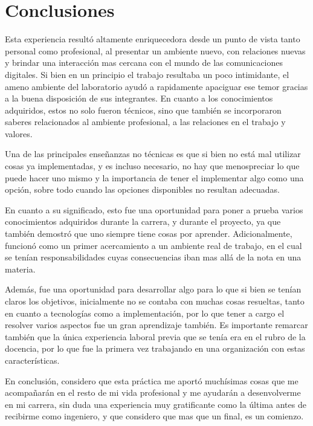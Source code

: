 \documentclass[a4paper,10pt]{article}
\begin{document}
\section{Conclusiones}
Esta experiencia resultó altamente enriquecedora desde un punto de vista tanto personal como profesional, al presentar un ambiente nuevo, con relaciones nuevas y brindar una interacción mas cercana con el mundo de las comunicaciones digitales. 
Si bien en un principio el trabajo resultaba un poco intimidante, el ameno ambiente del laboratorio ayudó a rapidamente apaciguar ese temor gracias a la buena disposición de sus integrantes. En cuanto a los conocimientos adquiridos, estos no solo fueron técnicos, sino que 
también se incorporaron saberes relacionados al ambiente profesional, a las relaciones en el trabajo y valores. 
\par
Una de las principales enseñanzas no técnicas es que si bien no está mal utilizar cosas ya implementadas, y es incluso necesario, no hay que menospreciar lo que
puede hacer uno mismo y la importancia de tener el implementar algo como una opción, sobre todo cuando las opciones disponibles no resultan adecuadas.
\par
En cuanto a su significado, esto fue una oportunidad para poner a prueba varios conocimientos adquiridos durante la carrera, y  durante el proyecto, ya que también demostró que uno siempre tiene cosas por aprender. Adicionalmente, funcionó como un primer 
acercamiento a un ambiente real de trabajo, en el cual se tenían responsabilidades cuyas consecuencias iban mas allá de la nota en una materia. 
\par
Además, fue una oportunidad para desarrollar algo para lo que si bien se tenían claros los objetivos, inicialmente no se contaba con
muchas cosas resueltas, tanto en cuanto a tecnologías como a implementación, por lo que tener a cargo el resolver varios aspectos fue un gran aprendizaje también. Es importante remarcar también que la única experiencia laboral previa que se tenía era en el rubro de la docencia, por lo que fue la primera vez trabajando en una organización con estas características.
\par
En conclusión, considero que esta práctica me aportó muchísimas cosas que me acompañarán en el resto de mi vida profesional y me ayudarán a desenvolverme en mi carrera, sin duda una experiencia muy gratificante como la última antes de recibirme como ingeniero, y que 
considero que mas que un final, es un comienzo.
\end{document}
